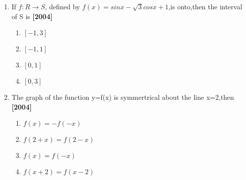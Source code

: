 \documentclass[journal,12pt,twocolumn]{IEEEtran}
\theoremstyle{remark}
\begin{document}
\begin{enumerate}[start=4]
\item {\small If $f:R \to S$, defined by $f(x)=sinx-\sqrt{3}cosx+1$},is onto,then the interval of S is	\hfill \textbf{[2004]}

	       \begin{enumerate}
		       \item $[-1,3]$
		       \item $[-1,1]$
		       \item $[0,1]$
		       \item $[0,3]$
	       \end{enumerate}
       \item The graph of the function y=f(x) is symmertrical about the line x=2,then \hfill \textbf{[2004]}
	       \begin{enumerate}
		       \item $f(x)=-f(-x)$
		       \item $f(2+x)=f(2-x)$
		       \item $f(x)=f(-x)$
		       \item $f(x+2)=f(x-2)$
	       \end{enumerate}
\pagebreak


\end{enumerate}
\end{document}
